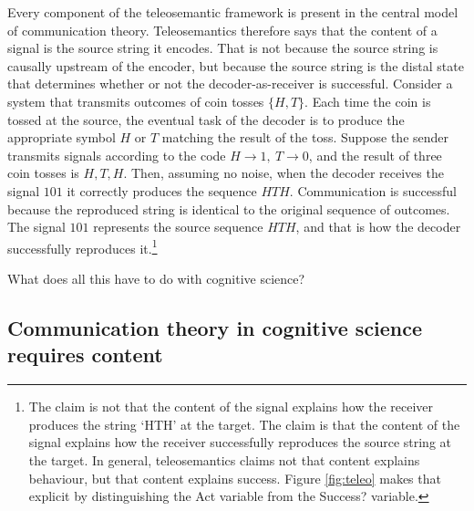 \documentclass[12pt]{article}
\begin{document}
% 

Every component of the teleosemantic framework is present in the central model of communication theory.
Teleosemantics therefore says that the content of a signal is the source string it encodes.
That is not because the source string is causally upstream of the encoder, but because the source string is the distal state that determines whether or not the decoder-as-receiver is successful.
Consider a system that transmits outcomes of coin tosses $\{H,T\}$.
Each time the coin is tossed at the source, the eventual task of the decoder is to produce the appropriate symbol $H$ or $T$ matching the result of the toss.
Suppose the sender transmits signals according to the code $H\rightarrow1,\ T\rightarrow0$, and the result of three coin tosses is $H, T, H$.
Then, assuming no noise, when the decoder receives the signal $101$ it correctly produces the sequence $HTH$.
Communication is successful because the reproduced string is identical to the original sequence of outcomes.
The signal $101$ represents the source sequence $HTH$, and that is how the decoder successfully reproduces it.\footnote{The claim is not that the content of the signal explains how the receiver produces the string `HTH' at the target. The claim is that the content of the signal explains how the receiver successfully reproduces the source string at the target. In general, teleosemantics claims not that content explains behaviour, but that content explains success. Figure \ref{fig:teleo} makes that explicit by distinguishing the Act variable from the Success? variable.}

What does all this have to do with cognitive science?

\subsection{Communication theory in cognitive science requires content}
\end{document}
